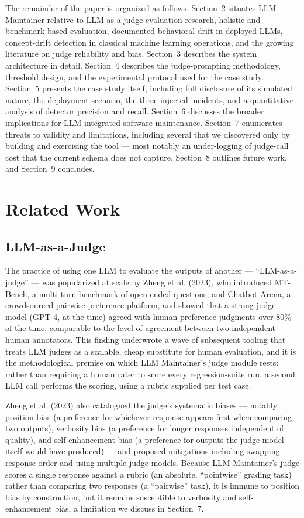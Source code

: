 \documentclass[11pt,a4paper]{article}
\begin{document}
The remainder of the paper is organized as follows. Section~2 situates
LLM Maintainer relative to LLM-as-a-judge evaluation research, holistic
and benchmark-based evaluation, documented behavioral drift in deployed
LLMs, concept-drift detection in classical machine learning operations,
and the growing literature on judge reliability and bias. Section~3
describes the system architecture in detail. Section~4 describes the
judge-prompting methodology, threshold design, and the experimental
protocol used for the case study. Section~5 presents the case study
itself, including full disclosure of its simulated nature, the
deployment scenario, the three injected incidents, and a quantitative
analysis of detector precision and recall. Section~6 discusses the
broader implications for LLM-integrated software maintenance. Section~7
enumerates threats to validity and limitations, including several that
we discovered only by building and exercising the tool --- most notably
an under-logging of judge-call cost that the current schema does not
capture. Section~8 outlines future work, and Section~9 concludes.

\section{Related Work}

\subsection{LLM-as-a-Judge}

The practice of using one LLM to evaluate the outputs of another ---
``LLM-as-a-judge'' --- was popularized at scale by Zheng et al. (2023),
who introduced MT-Bench, a multi-turn benchmark of open-ended questions,
and Chatbot Arena, a crowdsourced pairwise-preference platform, and
showed that a strong judge model (GPT-4, at the time) agreed with human
preference judgments over 80\% of the time, comparable to the level of
agreement between two independent human annotators. This finding
underwrote a wave of subsequent tooling that treats LLM judges as a
scalable, cheap substitute for human evaluation, and it is the
methodological premise on which LLM Maintainer's judge
module rests: rather than requiring a human rater to score every
regression-suite run, a second LLM call performs the scoring, using a
rubric supplied per test case.

Zheng et al. (2023) also catalogued the judge's
systematic biases --- notably position bias (a preference for whichever
response appears first when comparing two outputs), verbosity bias (a
preference for longer responses independent of quality), and
self-enhancement bias (a preference for outputs the judge model itself
would have produced) --- and proposed mitigations including swapping
response order and using multiple judge models. Because LLM
Maintainer's judge scores a single response against a
rubric (an absolute, ``pointwise'' grading task) rather than comparing two
responses (a ``pairwise'' task), it is immune to position bias by
construction, but it remains susceptible to verbosity and
self-enhancement bias, a limitation we discuss in Section~7.
\end{document}
